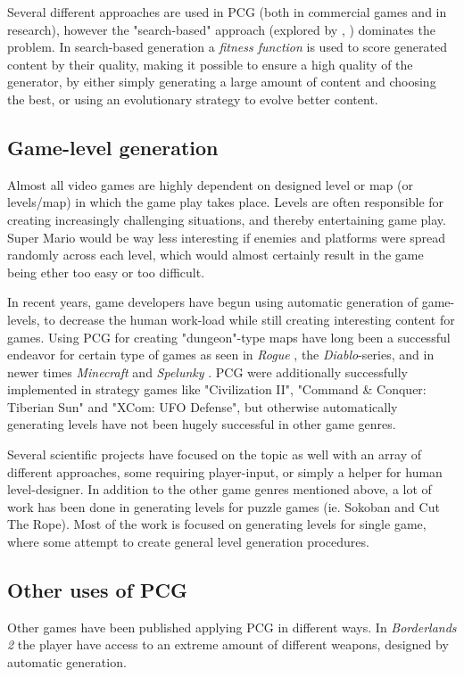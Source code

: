 \documentclass[a4paper,titlepage,final, twoside]{report}
\begin{document}
Several different approaches are used in PCG (both in commercial games and in research), however the "search-based" approach (explored by \citet{togelius11search}, \citet{pcgbook:ch2}) dominates the problem.
In search-based generation a \textit{fitness function} is used to score generated content by their quality, making it possible to ensure a high quality of the generator, by either simply generating a large amount of content and choosing the best, or using an evolutionary strategy to evolve better content.




\subsection{Game-level generation}
Almost all video games are highly dependent on designed level or map (or levels/map) in which the game play takes place. Levels are often responsible for creating increasingly challenging situations, and thereby entertaining game play. Super Mario would be way less interesting if enemies and platforms were spread randomly across each level, which would almost certainly result in the game being ether too easy or too difficult.

In recent years, game developers have begun using automatic generation of game-levels, to decrease the human work-load while still creating interesting content for games. Using PCG for creating "dungeon"-type maps have long been a successful endeavor for certain type of games as seen in \textit{Rogue} \citeyearpar{game:rogue}, the \textit{Diablo}-series, and in newer times \textit{Minecraft} \citeyearpar{game:minecraft} and \textit{Spelunky} \citeyearpar{game:spelunky}. PCG were additionally successfully implemented in strategy games like "Civilization II", "Command \& Conquer: Tiberian Sun" and "XCom: UFO Defense", but otherwise automatically generating levels have not been hugely successful in other game genres.

Several scientific projects have focused on the topic as well with an array of different approaches, some requiring player-input, or simply a helper for human level-designer. In addition to the other game genres mentioned above, a lot of work has been done in generating levels for puzzle games (ie. Sokoban and Cut The Rope).
Most of the work is focused on generating levels for single game, where some attempt to create general level generation procedures.


\subsection{Other uses of PCG}
Other games have been published applying PCG in different ways. In \textit{Borderlands 2} \citeyearpar{game:borderlands} the player have access to an extreme amount of different weapons, designed by automatic generation.
\end{document}
